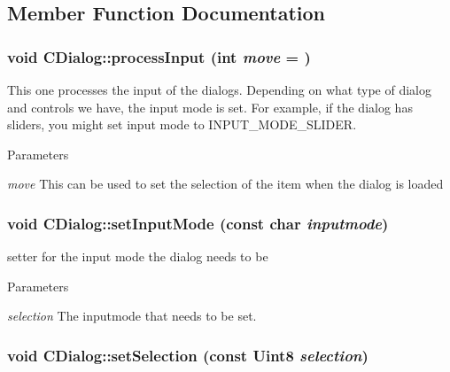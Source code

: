 \subsection{Member Function Documentation}
\hypertarget{class_c_dialog_a62748353c0cbd01c5ef6514bb045d4e6}{
\subsubsection[{processInput}]{\setlength{\rightskip}{0pt plus 5cm}void CDialog::processInput (int {\em move} = {})}}
\label{class_c_dialog_a62748353c0cbd01c5ef6514bb045d4e6}


This one processes the input of the dialogs. Depending on what type of dialog and controls we have, the input mode is set. For example, if the dialog has sliders, you might set input mode to INPUT\_\-MODE\_\-SLIDER. 


\begin{DoxyParams}{Parameters}
\item[{\em move}]This can be used to set the selection of the item when the dialog is loaded \end{DoxyParams}
\hypertarget{class_c_dialog_a494de44c4883f77a6bd0f56aeafa3d5d}{
\subsubsection[{setInputMode}]{\setlength{\rightskip}{0pt plus 5cm}void CDialog::setInputMode (const char {\em inputmode})}}
\label{class_c_dialog_a494de44c4883f77a6bd0f56aeafa3d5d}


setter for the input mode the dialog needs to be 


\begin{DoxyParams}{Parameters}
\item[{\em selection}]The inputmode that needs to be set. \end{DoxyParams}
\hypertarget{class_c_dialog_aba01d15c9428333b2252298a82560e2e}{
\subsubsection[{setSelection}]{\setlength{\rightskip}{0pt plus 5cm}void CDialog::setSelection (const Uint8 {\em selection})}}
\label{class_c_dialog_aba01d15c9428333b2252298a82560e2e}


